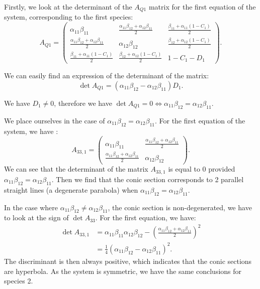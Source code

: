 \documentclass{article}
\begin{document}
Firstly, we look at the determinant of the $A_{Q1}$ matrix for the first equation of the system, corresponding to the first species:
\begin{equation}
    A_{Q1} = \begin{pmatrix}
    \alpha_{11}\beta_{11} & \frac{\alpha_{11}\beta_{12}+\alpha_{12}\beta_{11}}{2} & \frac{\beta_{11}+\alpha_{11}(1-C_1)}{2} \\
    \frac{\alpha_{11}\beta_{12}+\alpha_{12}\beta_{11}}{2} & \alpha_{12}\beta_{12} & \frac{\beta_{12}+\alpha_{12}(1-C_1)}{2} \\
    \frac{\beta_{11}+\alpha_{11}(1-C_1)}{2} & \frac{\beta_{12}+\alpha_{12}(1-C_1)}{2} & 1-C_1-D_1
    \end{pmatrix}.
\end{equation}

We can easily find an expression of the determinant of the matrix:
\begin{equation}
    \det A_{Q1} = (\alpha_{11}\beta_{12} - \alpha_{12}\beta_{11})D_1.
\end{equation}

We have $D_1 \neq 0$, therefore we have $\det A_{Q1} = 0 \Leftrightarrow \alpha_{11}\beta_{12} = \alpha_{12}\beta_{11}$.

We place ourselves in the case of $\alpha_{11}\beta_{12} = \alpha_{12}\beta_{11}$.
For the first equation of the system, we have :
\begin{equation}
    A_{33,1} = \begin{pmatrix}
    \alpha_{11}\beta_{11} & \frac{\alpha_{11}\beta_{12}+\alpha_{12}\beta_{11}}{2}\\
    \frac{\alpha_{11}\beta_{12}+\alpha_{12}\beta_{11}}{2} & \alpha_{12}\beta_{12}
    \end{pmatrix}.
\end{equation}
We can see that the determinant of the matrix $A_{33,1}$ is equal to 0 provided $\alpha_{11}\beta_{12} = \alpha_{12}\beta_{11}$. 
Then we find that the conic section corresponds to 2 parallel straight lines (a degenerate parabola) when $\alpha_{11}\beta_{12} = \alpha_{12}\beta_{11}$.

In the case where $\alpha_{11}\beta_{12} \neq \alpha_{12}\beta_{11}$, the conic section is non-degenerated, we have to look at the sign of $\det A_{33}$. For the first equation, we have:
\begin{align*}
    \det A_{33,1} &=  \alpha_{11}\beta_{11}\alpha_{12}\beta_{12} - (\frac{\alpha_{11}\beta_{12} + \alpha_{12}\beta_{11}}{2})^2\\
    &= \frac{1}{4}(\alpha_{11}\beta_{12}-\alpha_{12}\beta_{11})^2.
\end{align*}
The discriminant is then always positive, which indicates that the conic sections are hyperbola. As the system is symmetric, we have the same conclusions for species 2.\\
\end{document}
